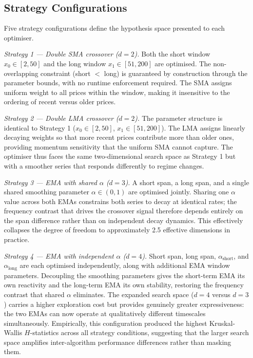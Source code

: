 \subsection{Strategy Configurations}

Five strategy configurations define the hypothesis space presented to each optimiser.

\textit{Strategy 1 --- Double SMA crossover ($d=2$).} Both the short window
$x_0 \in [2,50]$ and the long window $x_1 \in [51,200]$ \cite{investopedia_moving_averages} 
are optimised. The non-overlapping constraint (short $<$ long) is guaranteed by construction
through the parameter bounds, with no runtime enforcement required. The SMA
assigns uniform weight to all prices within the window, making it
insensitive to the ordering of recent versus older prices.

\textit{Strategy 2 --- Double LMA crossover ($d=2$).} The parameter
structure is identical to Strategy 1 ($x_0 \in [2,50]$, $x_1 \in
[51,200]$). The LMA assigns linearly decaying weights so that more recent
prices contribute more than older ones, providing momentum sensitivity that
the uniform SMA cannot capture. The optimiser thus faces the same
two-dimensional search space as Strategy 1 but with a smoother series that
responds differently to regime changes.

\textit{Strategy 3 --- EMA with shared $\alpha$ ($d=3$).} A short span, a
long span, and a single shared smoothing parameter $\alpha \in (0,1)$ are
optimised jointly. Sharing one $\alpha$ value across both EMAs constrains 
both series to decay at identical rates; the
frequency contrast that drives the crossover signal therefore depends
entirely on the span difference rather than on independent decay dynamics.
This effectively collapses the degree of freedom to approximately 2.5
effective dimensions in practice.

\textit{Strategy 4 --- EMA with independent $\alpha$ ($d=4$).} Short span,
long span, $\alpha_\mathrm{short}$, and $\alpha_\mathrm{long}$ are each
optimised independently, along with additional EMA window parameters.
Decoupling the smoothing parameters gives the short-term EMA its own
reactivity and the long-term EMA its own stability, restoring the frequency
contrast that shared $\alpha$ eliminates. The expanded search space ($d=4$
versus $d=3$) carries a higher exploration cost but provides genuinely
greater expressiveness: the two EMAs can now operate at qualitatively
different timescales simultaneously. Empirically, this configuration
produced the highest Kruskal-Wallis $H$-statistics across all strategy
conditions, suggesting that the larger search space amplifies
inter-algorithm performance differences rather than masking them.


